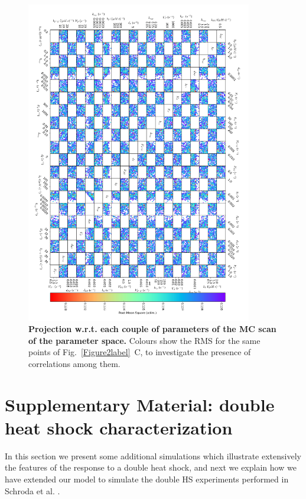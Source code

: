 \documentclass[oneside, 10pt, a4paper, twocolumn]{article}
\begin{document}
\begin{figure}
\centering
\includegraphics[width=0.88\textwidth]{Figure5_SupMat.pdf}
\caption{\small{\textbf{Projection w.r.t. each couple of parameters of the MC scan of the parameter space.} Colours show the RMS for the same points of Fig.~\ref{Figure2label}~C, to investigate the presence of correlations among them.}
}
\label{Figure5label}
\end{figure}

\clearpage




\section{Supplementary Material: double heat shock characterization}

In this section we present some additional simulations which illustrate extensively the features of the response to a double heat shock, and next we explain how we have extended our model to simulate the double HS experiments performed in Schroda et al. \cite{Schroda2000}.
\end{document}
